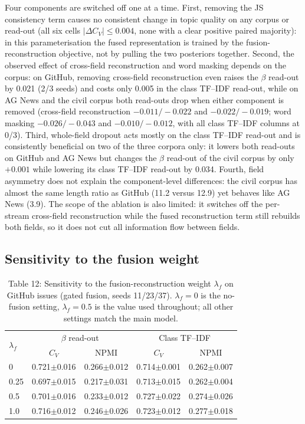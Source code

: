 \documentclass{article}
\begin{document}
Four components are switched off one at a time. First, removing the JS consistency term causes no
consistent change in topic quality on any corpus or read-out (all six cells
$|\Delta C_V|\leq0.004$, none with a clear positive paired majority): in this
parameterisation the fused representation is trained by the fusion-reconstruction objective, not by
pulling the two posteriors together. Second, the observed effect of cross-field reconstruction
and word masking depends on the corpus: on GitHub, removing cross-field reconstruction even raises
the $\beta$ read-out by 0.021 (2/3 seeds) and costs only 0.005 in the class TF--IDF read-out, while
on AG News and the civil corpus both read-outs drop when either component is removed (cross-field
reconstruction $-0.011/-0.022$ and $-0.022/-0.019$; word masking $-0.026/-0.043$ and
$-0.010/-0.012$, with all class TF--IDF columns at 0/3). Third, whole-field dropout acts mostly on
the class TF--IDF read-out and is consistently beneficial on two of the three corpora only: it
lowers both read-outs on GitHub
and AG News but changes the $\beta$ read-out of the civil corpus by only $+0.001$ while lowering
its class TF--IDF read-out by 0.034. Fourth, field asymmetry does not explain the component-level
differences: the civil corpus has almost the same length ratio as GitHub (11.2 versus 12.9) yet
behaves like AG News (3.9). The scope of the ablation is also limited: it switches off the
per-stream cross-field reconstruction while the fused reconstruction term still rebuilds both
fields, so it does not cut all information flow between fields.

\subsection{Sensitivity to the fusion weight}

\begin{table}[t]
\centering
\caption{Table 12: Sensitivity to the fusion-reconstruction weight $\lambda_f$ on GitHub issues (gated fusion, seeds 11/23/37). $\lambda_f=0$ is the no-fusion setting, $\lambda_f=0.5$ is the value used throughout; all other settings match the main model.}
\label{tab:weight}
\small
\setlength{\tabcolsep}{4pt}
\begin{tabular}{lcccc}
\toprule
\multirow{2}{*}{$\lambda_f$} & \multicolumn{2}{c}{$\beta$ read-out} & \multicolumn{2}{c}{Class TF--IDF} \\
 & $C_V$ & NPMI & $C_V$ & NPMI \\
\midrule
0 & 0.721$\pm$0.016 & 0.266$\pm$0.012 & 0.714$\pm$0.001 & 0.262$\pm$0.007 \\
0.25 & 0.697$\pm$0.015 & 0.217$\pm$0.031 & 0.713$\pm$0.015 & 0.262$\pm$0.004 \\
0.5 & 0.701$\pm$0.016 & 0.233$\pm$0.012 & 0.727$\pm$0.022 & 0.274$\pm$0.026 \\
1.0 & 0.716$\pm$0.012 & 0.246$\pm$0.026 & 0.723$\pm$0.012 & 0.277$\pm$0.018 \\
\bottomrule
\end{tabular}
\end{table}
\end{document}
